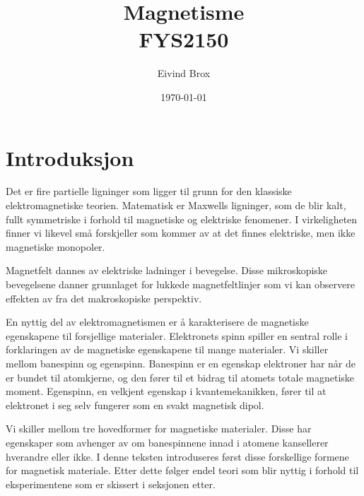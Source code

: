 \documentclass[a4paper,11pt, twocolumn]{article}
\title{Magnetisme\\ FYS2150}
\author{Eivind Brox}
\date{\today}
\begin{document}
\maketitle

\maketitle



\begin{abstract}
\end{abstract}

\section{Introduksjon}
Det er fire partielle ligninger som ligger til grunn for den klassiske elektromagnetiske teorien. Matematisk er Maxwells ligninger, som de blir kalt, fullt symmetriske i forhold til magnetiske og elektriske fenomener. I virkeligheten finner vi likevel små forskjeller som kommer av at det finnes elektriske, men ikke magnetiske monopoler.

Magnetfelt dannes av elektriske ladninger i bevegelse. Disse mikroskopiske bevegelsene danner grunnlaget for lukkede magnetfeltlinjer som vi kan observere effekten av fra det makroskopiske perspektiv. 

En nyttig del av elektromagnetismen er å karakterisere de magnetiske egenskapene til forsjellige materialer. Elektronets spinn spiller en sentral rolle i forklaringen av de magnetiske egenskapene til mange materialer. Vi skiller mellom banespinn og egenspinn. Banespinn er en egenskap elektroner har når de er bundet til atomkjerne, og den fører til et bidrag til atomets totale magnetiske moment. Egenspinn, en velkjent egenskap i kvantemekanikken, fører til at elektronet i seg selv fungerer som en svakt magnetisk dipol.

Vi skiller mellom tre hovedformer for magnetiske materialer. Disse har egenskaper som avhenger av om banespinnene innad i atomene kansellerer hverandre eller ikke. I denne teksten introduseres først disse forskellige formene for magnetisk materiale. Etter dette følger endel teori som blir nyttig i forhold til eksperimentene som er skissert i seksjonen etter.
\end{document}
